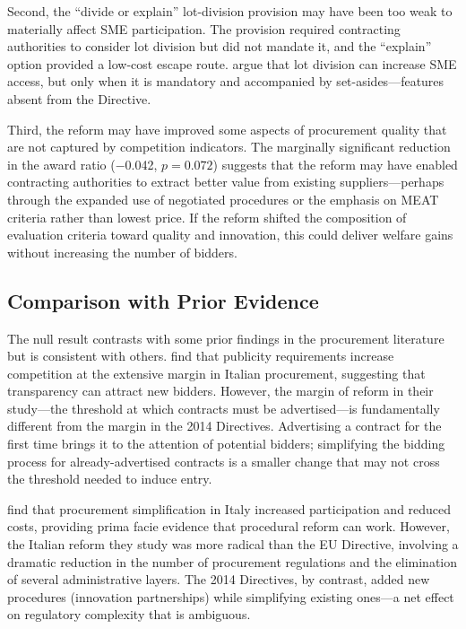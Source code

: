 \documentclass[12pt]{article}
\begin{document}
Second, the ``divide or explain'' lot-division provision may have been too weak to materially affect SME participation. The provision required contracting authorities to consider lot division but did not mandate it, and the ``explain'' option provided a low-cost escape route. \citet{bergmanLundberg2013} argue that lot division can increase SME access, but only when it is mandatory and accompanied by set-asides---features absent from the Directive.

Third, the reform may have improved some aspects of procurement quality that are not captured by competition indicators. The marginally significant reduction in the award ratio ($-$0.042, $p = 0.072$) suggests that the reform may have enabled contracting authorities to extract better value from existing suppliers---perhaps through the expanded use of negotiated procedures or the emphasis on MEAT criteria rather than lowest price. If the reform shifted the composition of evaluation criteria toward quality and innovation, this could deliver welfare gains without increasing the number of bidders.

\subsection{Comparison with Prior Evidence}

The null result contrasts with some prior findings in the procurement literature but is consistent with others. \citet{coviellaMariniello2014} find that publicity requirements increase competition at the extensive margin in Italian procurement, suggesting that transparency can attract new bidders. However, the margin of reform in their study---the threshold at which contracts must be advertised---is fundamentally different from the margin in the 2014 Directives. Advertising a contract for the first time brings it to the attention of potential bidders; simplifying the bidding process for already-advertised contracts is a smaller change that may not cross the threshold needed to induce entry.

\citet{cingano2023} find that procurement simplification in Italy increased participation and reduced costs, providing prima facie evidence that procedural reform can work. However, the Italian reform they study was more radical than the EU Directive, involving a dramatic reduction in the number of procurement regulations and the elimination of several administrative layers. The 2014 Directives, by contrast, added new procedures (innovation partnerships) while simplifying existing ones---a net effect on regulatory complexity that is ambiguous.
\end{document}
